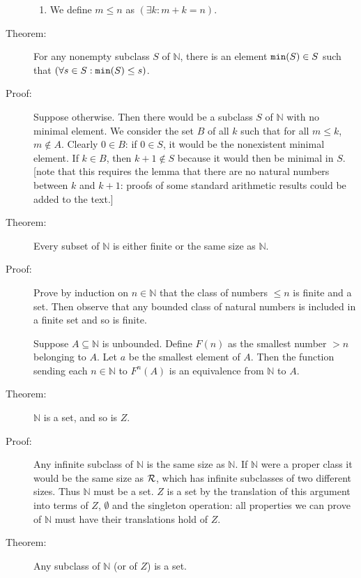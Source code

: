 \documentclass[12pt]{article}
\begin{document}
\begin{description}
\begin{enumerate}
\item  We define $m \leq n$ as $(\exists k:m+k = n)$.

\end{enumerate}

\item[Theorem:]  For any nonempty subclass $S$ of $\mathbb N$, there is an element ${\tt min}(S) \in S$ such that $(\forall s \in S:{\tt min}(S) \leq s)$.

\item[Proof:]  Suppose otherwise.  Then there would be a subclass $S$ of $\mathbb N$ with no minimal element.  We consider the set $B$ of all $k$ such that for all $m \leq k$, $m \not \in A$.
Clearly $0 \in B$:  if $0 \in S$, it would be the nonexistent minimal element.  If $k \in B$, then $k+1 \not\in S$ because it would then be minimal in $S$.  [note that this requires
the lemma that there are no natural numbers between $k$ and $k+1$:  proofs of some standard arithmetic results could be added to the text.]

\item[Theorem:]  Every subset of $\mathbb N$ is either finite or the same size as $\mathbb N$.

\item[Proof:]  Prove by induction on $n \in \mathbb N$ that the class of numbers $\leq n$ is finite and a set.  Then observe that any bounded class of natural numbers
is included in a finite set and so is finite.

Suppose $A \subseteq \mathbb N$ is unbounded.  Define $F(n)$ as the smallest number $>n$ belonging to $A$.  Let $a$ be the smallest element of $A$.  Then the function sending
each $n \in \mathbb N$ to $F^n(A)$ is an equivalence from $\mathbb N$ to $A$.

\item[Theorem:]  $\mathbb N$ is a set, and so is $Z$.

\item[Proof:]  Any infinite subclass of $\mathbb N$ is the same size as $\mathbb N$.  If $\mathbb N$ were a proper class it would be the same size as $\cal R$, which has infinite subclasses of two different sizes.  Thus $\mathbb N$ must be a set.  $Z$ is a set by the translation of this argument into terms of $Z$, $\emptyset$ and the singleton operation:  all properties
we can prove of $\mathbb N$ must have their translations hold of $Z$.

\item[Theorem:]  Any subclass of $\mathbb N$ (or of $Z$) is a set.


\end{description}
\end{document}
